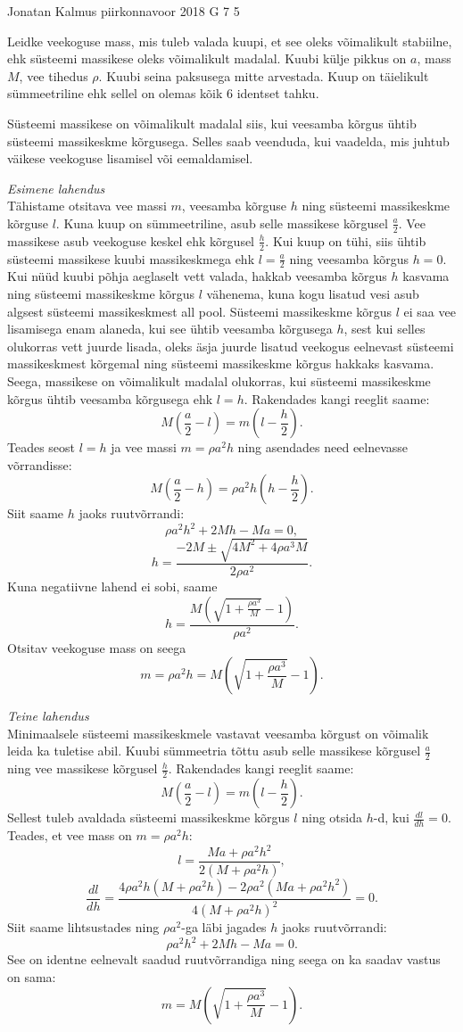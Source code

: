 {Jonatan Kalmus} %
{piirkonnavoor} %
{2018} %
{G 7} %
{5} %
{
\ifStatement
Leidke veekoguse mass, mis tuleb valada kuupi, et see oleks võimalikult stabiilne, ehk süsteemi massikese oleks võimalikult madalal. Kuubi külje pikkus on $a$, mass $M$, vee tihedus $\rho$. Kuubi seina paksusega mitte arvestada. Kuup on täielikult sümmeetriline ehk sellel on olemas kõik 6 identset tahku.
\fi


\ifHint
Süsteemi massikese on võimalikult madalal siis, kui veesamba kõrgus ühtib süsteemi massikeskme kõrgusega. Selles saab veenduda, kui vaadelda, mis juhtub väikese veekoguse lisamisel või eemaldamisel.
\fi


\ifSolution
\emph{Esimene lahendus}\\
Tähistame otsitava vee massi $m$, veesamba kõrguse $h$ ning süsteemi massikeskme kõrguse $l$. Kuna kuup on sümmeetriline, asub selle massikese kõrgusel $\frac{a}{2}$. Vee massikese asub veekoguse keskel ehk kõrgusel $\frac{h}{2}$. Kui kuup on tühi, siis ühtib süsteemi massikese kuubi massikeskmega ehk $l=\frac{a}{2}$ ning veesamba kõrgus $h=0$. Kui nüüd kuubi põhja aeglaselt vett valada, hakkab veesamba kõrgus $h$ kasvama ning süsteemi massikeskme kõrgus $l$ vähenema, kuna kogu lisatud vesi asub algsest süsteemi massikeskmest all pool. Süsteemi massikeskme kõrgus $l$ ei saa vee lisamisega enam alaneda, kui see ühtib veesamba kõrgusega $h$, sest kui selles olukorras vett juurde lisada, oleks äsja juurde lisatud veekogus eelnevast süsteemi massikeskmest kõrgemal ning süsteemi massikeskme kõrgus hakkaks kasvama. Seega, massikese on võimalikult madalal olukorras, kui süsteemi massikeskme kõrgus ühtib veesamba kõrgusega ehk $l=h$.
Rakendades kangi reeglit saame:
$$M(\frac{a}{2}-l)=m(l-\frac{h}{2}).$$ 
Teades seost $l=h$ ja vee massi $m=\rho a^2h$ ning asendades need eelnevasse võrrandisse:
$$M(\frac{a}{2}-h)=\rho a^2h(h-\frac{h}{2}).$$ 
Siit saame $h$ jaoks ruutvõrrandi:
$$\rho a^2h^2+2Mh-Ma=0,$$
$$h=\frac{-2M \pm \sqrt{4M^2+4\rho a^3M}}{2\rho a^2}.$$
Kuna negatiivne lahend ei sobi, saame
$$h=\frac{M(\sqrt{1+\frac{\rho a^3}{M}}-1)}{\rho a^2}.$$
Otsitav veekoguse mass on seega
$$m=\rho a^2h=M(\sqrt{1+\frac{\rho a^3}{M}}-1).$$

\emph{Teine lahendus}\\
Minimaalsele süsteemi massikeskmele vastavat veesamba kõrgust on võimalik leida ka tuletise abil. Kuubi sümmeetria tõttu asub selle massikese kõrgusel $\frac{a}{2}$ ning vee massikese kõrgusel $\frac{h}{2}$. Rakendades kangi reeglit saame: 
$$M(\frac{a}{2}-l)=m(l-\frac{h}{2}).$$ 
Sellest tuleb avaldada süsteemi massikeskme kõrgus $l$ ning otsida $h$-d, kui $\frac{dl}{dh}=0$. Teades, et vee mass on $m=\rho a^2h$:
$$l=\frac{Ma+\rho a^2h^2}{2(M+\rho a^2h)},$$ 
$$\frac{dl}{dh}=\frac{4\rho a^2h(M+\rho a^2h)-2\rho a^2(Ma+\rho a^2h^2)}{4(M+\rho a^2h)^2}=0.$$ 
Siit saame lihtsustades ning $\rho a^2$-ga läbi jagades $h$ jaoks ruutvõrrandi:
$$\rho a^2h^2+2Mh-Ma=0.$$ 
See on identne eelnevalt saadud ruutvõrrandiga ning seega on ka saadav vastus on sama:
$$m=M(\sqrt{1+\frac{\rho a^3}{M}}-1).$$
\fi


}
